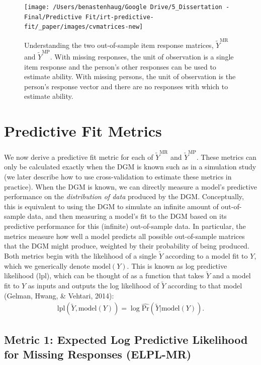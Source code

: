 \documentclass[
  english,
  man,floatsintext]{apa7}
\begin{document}
\begin{figure}

{\centering \texttt{[image: /Users/benastenhaug/Google Drive/5\_Dissertation - Final/Predictive Fit/irt-predictive-fit/\_paper/images/cvmatrices-new]}

}

\caption{Understanding the two out-of-sample item response matrices, $\tilde Y^{\text{MR}}$ and $\tilde Y^{\text{MP}}$. With missing responses, the unit of observation is a single item response and the person's other responses can be used to estimate ability. With missing persons, the unit of observation is the person's response vector and there are no responses with which to estimate ability.}\label{fig:elpl}
\end{figure}

\hypertarget{pfm}{%
\section{Predictive Fit Metrics}\label{pfm}}

We now derive a predictive fit metric for each of \(\tilde Y^{\text{MR}}\) and \(\tilde Y^{\text{MP}}\). These metrics can only be calculated exactly when the DGM is known such as in a simulation study (we later describe how to use cross-validation to estimate these metrics in practice). When the DGM is known, we can directly measure a model's predictive performance on the \emph{distribution of data} produced by the DGM. Conceptually, this is equivalent to using the DGM to simulate an infinite amount of out-of-sample data, and then measuring a model's fit to the DGM based on its predictive performance for this (infinite) out-of-sample data. In particular, the metrics measure how well a model predicts all possible out-of-sample matrices that the DGM might produce, weighted by their probability of being produced. Both metrics begin with the likelihood of a single \(\tilde{Y}\) according to a model fit to \(Y\), which we generically denote \(\text{model}(Y)\). This is known as log predictive likelihood (lpl), which can be thought of as a function that takes \(\tilde Y\) and a model fit to \(Y\) as inputs and outputs the log likelihood of \(\tilde Y\) according to that model (Gelman, Hwang, \& Vehtari, 2014):
\begin{align}
\text{lpl}(\tilde{Y}, \text{model}(Y))  = \log \hat{\text{Pr}}(\tilde{Y} | \text{model}(Y)).
\end{align}

\hypertarget{metric-1-expected-log-predictive-likelihood-for-missing-responses-elpl-mr}{%
\subsection{Metric 1: Expected Log Predictive Likelihood for Missing Responses (ELPL-MR)}\label{metric-1-expected-log-predictive-likelihood-for-missing-responses-elpl-mr}}
\end{document}
